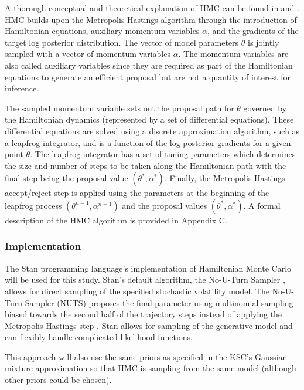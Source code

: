 \documentclass[12pt, a4paper]{article}
\begin{document}
        A thorough conceptual and theoretical explanation of HMC can be found in \citet{gelman2013bayesian} and \citet{betancourt2017conceptual}. HMC builds upon the Metropolis Hastings algorithm through the introduction of Hamiltonian equations, auxiliary momentum variables $\alpha$, and the gradients of the target log posterior distribution. The vector of model parameters $\theta$ is jointly sampled with a vector of momentum variables $\alpha$. The momentum variables are also called auxiliary variables since they are required as part of the Hamiltonian equations to generate an efficient proposal but are not a quantity of interest for inference.

        The sampled momentum variable sets out the proposal path for $\theta$ governed by the Hamiltonian dynamics (represented by a set of differential equations). These differential equations are solved using a discrete approximation algorithm, such as a leapfrog integrator, and is a function of the log posterior gradients for a given point $\theta$. The leapfrog integrator has a set of tuning parameters which determines the size and number of steps to be taken along the Hamiltonian path with the final step being the proposal value $(\theta^{\ast}, \alpha^{\ast})$. Finally, the Metropolis Hastings accept/reject step is applied using the parameters at the beginning of the leapfrog process $(\theta^{n-1}, \alpha^{n-1})$ and the proposal values $(\theta^{\ast}, \alpha^{\ast})$. A formal description of the HMC algorithm is provided in Appendix C.

        \subsubsection{Implementation}
        The Stan programming language's implementation of Hamiltonian Monte Carlo will be used for this study. Stan's default algorithm, the No-U-Turn Sampler \citep{hoffman2014no}, allows for direct sampling of the specified stochastic volatility model. The No-U-Turn Sampler (NUTS) proposes the final parameter using multinomial sampling biased towards the second half of the trajectory steps instead of applying the Metropolis-Hastings step \citep{betancourt2016identifying}. Stan allows for sampling of the generative model and can flexibly handle complicated likelihood functions. 
        
        This approach will also use the same priors as specified in the KSC's Gaussian mixture approximation so that HMC is sampling from the same model (although other priors could be chosen). 
\end{document}
